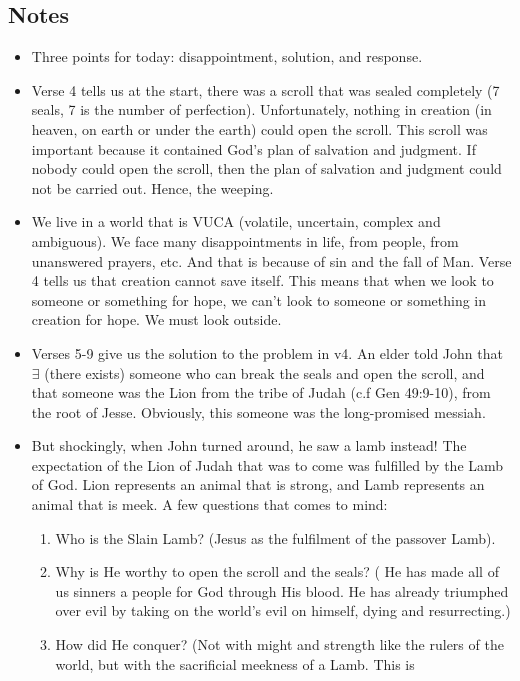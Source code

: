 \subsection*{Notes}
\begin{itemize}
  \item{Three points for today: disappointment, solution, and response.}
  \item{Verse 4 tells us at the start, there was a scroll that was sealed
  completely (7 seals, 7 is the number of perfection).  Unfortunately,
  nothing in creation (in heaven, on earth or under the earth) could open the
  scroll.  This scroll was important because it contained God's plan of
  salvation and judgment.  If nobody could open the scroll, then the plan of
  salvation and judgment could not be carried out.  Hence, the weeping.}
  \item{We live in a world that is VUCA (volatile, uncertain, complex and
  ambiguous).  We face many disappointments in life, from people, from
  unanswered prayers, etc.  And that is because of sin and the fall of Man.
  Verse 4 tells us that creation cannot save itself.  This means that when we
  look to someone or something for hope, we can't look to someone or
  something in creation for hope.  We must look outside.}
  \item{Verses 5-9 give us the solution to the problem in v4.  An elder told
  John that $\exists$ (there exists) someone who can break the seals and open
  the scroll, and that someone was the Lion from the tribe of Judah (c.f Gen
  49:9-10), from the root of Jesse.  Obviously, this someone was the
  long-promised messiah. }
  \item{But shockingly, when John turned around, he saw a lamb instead! The expectation of the Lion of Judah that was to come was fulfilled by the Lamb of God. Lion represents an animal that is strong, and Lamb represents an animal that is meek. A few questions that comes to mind:
  \begin{enumerate}
    \item{Who is the Slain Lamb? (Jesus as the fulfilment of the passover Lamb).}
    \item{Why is He worthy to open the scroll and the seals?  ( He has made
    all of us sinners a people for God through His blood.  He has already
    triumphed over evil by taking on the world's evil on himself, dying and
    resurrecting.)}
    \item{How did He conquer?  (Not with might and strength like the rulers
    of the world, but with the sacrificial meekness of a Lamb.  This is
}
\end{enumerate}}
\end{itemize}
